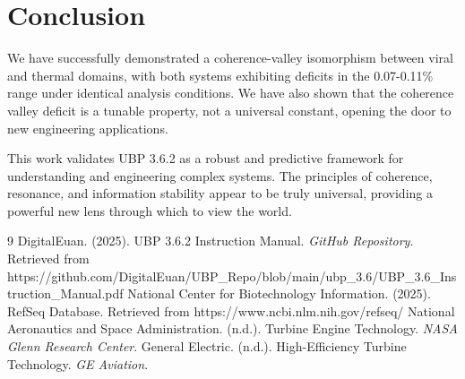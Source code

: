 \documentclass[11pt,a4paper]{article}
\begin{document}
\section{Conclusion}

We have successfully demonstrated a coherence-valley isomorphism between viral and thermal domains, with both systems exhibiting deficits in the 0.07-0.11\% range under identical analysis conditions. We have also shown that the coherence valley deficit is a tunable property, not a universal constant, opening the door to new engineering applications.

This work validates UBP 3.6.2 as a robust and predictive framework for understanding and engineering complex systems. The principles of coherence, resonance, and information stability appear to be truly universal, providing a powerful new lens through which to view the world.

\begin{thebibliography}{9}
 DigitalEuan. (2025). UBP 3.6.2 Instruction Manual. \textit{GitHub Repository}. Retrieved from https://github.com/DigitalEuan/UBP\_Repo/blob/main/ubp\_3.6/UBP\_3.6\_Instruction\_Manual.pdf
 National Center for Biotechnology Information. (2025). RefSeq Database. Retrieved from https://www.ncbi.nlm.nih.gov/refseq/
 National Aeronautics and Space Administration. (n.d.). Turbine Engine Technology. \textit{NASA Glenn Research Center}.
 General Electric. (n.d.). High-Efficiency Turbine Technology. \textit{GE Aviation}.
\end{thebibliography}
\end{document}
